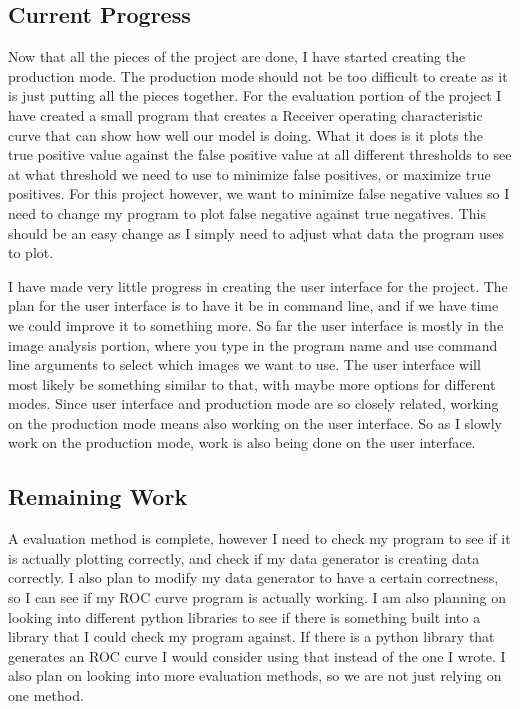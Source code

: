 \documentclass[onecolumn, draftclsnofoot,10pt, compsoc]{IEEEtran}
\begin{document}
\subsection{Current Progress}
Now that all the pieces of the project are done, I have started creating the production mode. The production mode should not be too difficult to create as it is just putting all the pieces together. 
For the evaluation portion of the project I have created a small program that creates a Receiver operating characteristic curve that can show how well our model is doing. What it does is it plots the true positive value against the false positive value at all different thresholds to see at what threshold we need to use to minimize false positives, or maximize true positives. For this project however, we want to minimize false negative values so I need to change my program to plot false negative against true negatives. This should be an easy change as I simply need to adjust what data the program uses to plot.

I have made very little progress in creating the user interface for the project. The plan for the user interface is to have it be in command line, and if we have time we could improve it to something more. So far the user interface is mostly in the image analysis portion, where you type in the program name and use command line arguments to select which images we want to use. The user interface will most likely be something similar to that, with maybe more options for different modes. Since user interface and production mode are so closely related, working on the production mode means also working on the user interface. So as I slowly work on the production mode, work is also being done on the user interface.

\subsection{Remaining Work}
A evaluation method is complete, however I need to check my program to see if it is actually plotting correctly, and check if my data generator is creating data correctly. I also plan to modify my data generator to have a certain correctness, so I can see if my ROC curve program is actually working. I am also planning on looking into different python libraries to see if there is something built into a library that I could check my program against. If there is a python library that generates an ROC curve I would consider using that instead of the one I wrote. I also plan on looking into more evaluation methods, so we are not just relying on one method.
\end{document}
